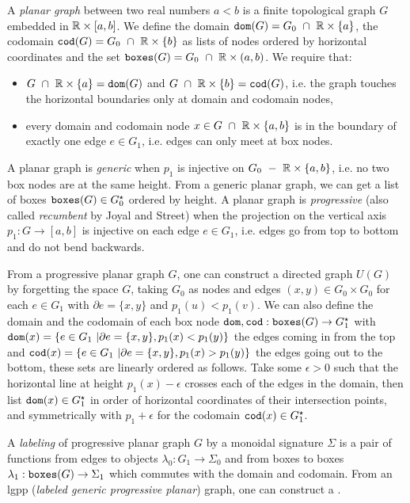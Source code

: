 A \emph{planar graph} between two real numbers $a < b$ is a finite topological graph $G$ embedded in $\mathbb{R} \times [a, b]$.
We define the domain $\mathtt{dom}(G) = G_0 \ \cap \ \mathbb{R} \times \{ a \}$, the codomain $\mathtt{cod}(G) = G_0 \ \cap \ \mathbb{R} \times \{ b \}$ as lists of nodes ordered by horizontal coordinates and the set $\mathtt{boxes}(G) = G_0 \ \cap \ \mathbb{R} \times (a, b)$.
We require that:
\begin{itemize}
    \item $G \ \cap \ \mathbb{R} \times \{ a \} = \mathtt{dom}(G)$ and $G \ \cap \ \mathbb{R} \times \{ b \} = \mathtt{cod}(G)$, i.e. the graph touches the horizontal boundaries only at domain and codomain nodes,
    \item every domain and codomain node $x \in G \ \cap \ \mathbb{R} \times \{ a, b \}$ is in the boundary of exactly one edge $e \in G_1$, i.e. edges can only meet at box nodes.
\end{itemize}
A planar graph is \emph{generic} when $p_1$ is injective on $G_0 \ - \ \mathbb{R} \times \{ a, b \}$, i.e. no two box nodes are at the same height.
From a generic planar graph, we can get a list of boxes $\mathtt{boxes}(G) \in G_0^\star$ ordered by height.
A planar graph is \emph{progressive} (also called \emph{recumbent} by Joyal and Street) when the projection on the vertical axis $p_1 : G \to [a, b]$ is injective on each edge $e \in G_1$, i.e. edges go from top to bottom and do not bend backwards.

From a progressive planar graph $G$, one can construct a directed graph $U(G)$ by forgetting the space $G$, taking $G_0$ as nodes and edges $(x, y) \in G_0 \times G_0$ for each $e \in G_1$ with $\partial e = \{ x, y \}$ and $p_1(u) < p_1(v)$.
We can also define the domain and the codomain of each box node $\mathtt{dom}, \mathtt{cod} : \mathtt{boxes}(G) \to G_1^\star$ with
$\mathtt{dom}(x) = \{ e \in G_1 \ \vert \partial e = \{ x, y \}, p_1(x) < p_1(y) \}$ the edges coming in from the top and
$\mathtt{cod}(x) = \{ e \in G_1 \ \vert \partial e = \{ x, y \}, p_1(x) > p_1(y) \}$ the edges going out to the bottom, these sets are linearly ordered as follows.
Take some $\epsilon > 0$ such that the horizontal line at height $p_1(x) - \epsilon$ crosses each of the edges in the domain, then list $\mathtt{dom}(x) \in G_1^\star$ in order of horizontal coordinates of their intersection points, and symmetrically with $p_1 + \epsilon$ for the codomain $\mathtt{cod}(x) \in G_1^\star$.

A \emph{labeling} of progressive planar graph $G$ by a monoidal signature $\Sigma$ is a pair of functions from edges to objects $\lambda_0 : G_1 \to \Sigma_0$ and from boxes to boxes $\lambda_1 : \mathtt{boxes}(G) \to \Sigma_1$ which commutes with the domain and codomain.
From an lgpp (\emph{labeled generic progressive planar}) graph, one can construct a .

